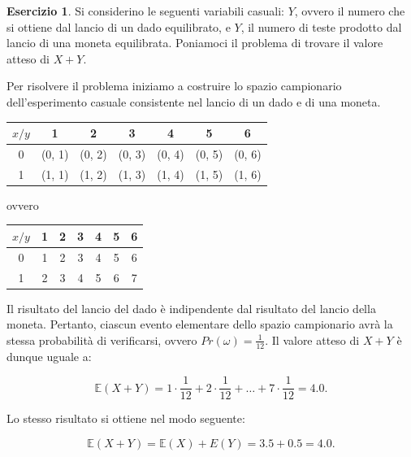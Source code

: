 \documentclass[
  11pt,
]{krantz}
\newcommand{\E}{\mathbb{E}} %
\theoremstyle{definition}
\theoremstyle{definition}
\theoremstyle{definition}
\newtheorem{exercise}{Esercizio}[chapter]
\theoremstyle{definition}
\theoremstyle{remark}
\begin{document}
\begin{exercise}
Si considerino le seguenti variabili casuali: \(Y\), ovvero il numero che si ottiene dal lancio di un dado equilibrato, e \(Y\), il numero di teste prodotto dal lancio di una moneta equilibrata. Poniamoci il problema di trovare il valore atteso di \(X+Y\).

Per risolvere il problema iniziamo a costruire lo spazio campionario dell'esperimento casuale consistente nel lancio di un dado e di una moneta.

\begin{longtable}[]{@{}ccccccc@{}}
\toprule
\(x/ y\) & 1 & 2 & 3 & 4 & 5 & 6 \\
\midrule
\endhead
0 & (0, 1) & (0, 2) & (0, 3) & (0, 4) & (0, 5) & (0, 6) \\
1 & (1, 1) & (1, 2) & (1, 3) & (1, 4) & (1, 5) & (1, 6) \\
\bottomrule
\end{longtable}

\noindent ovvero

\begin{longtable}[]{@{}ccccccc@{}}
\toprule
\(x/ y\) & 1 & 2 & 3 & 4 & 5 & 6 \\
\midrule
\endhead
0 & 1 & 2 & 3 & 4 & 5 & 6 \\
1 & 2 & 3 & 4 & 5 & 6 & 7 \\
\bottomrule
\end{longtable}

\noindent Il risultato del lancio del dado è indipendente dal risultato del lancio della moneta. Pertanto, ciascun evento elementare dello spazio campionario avrà la stessa probabilità di verificarsi, ovvero \(Pr(\omega) = \frac{1}{12}\). Il valore atteso di \(X+Y\) è dunque uguale a:

\[
\E(X+Y) = 1 \cdot \frac{1}{12} + 2 \cdot \frac{1}{12} + \dots + 7 \cdot \frac{1}{12} = 4.0.
\]

Lo stesso risultato si ottiene nel modo seguente:

\[
\E(X+Y) = \E(X) + E(Y) = 3.5 + 0.5 = 4.0.
\]
\end{exercise}
\end{document}
